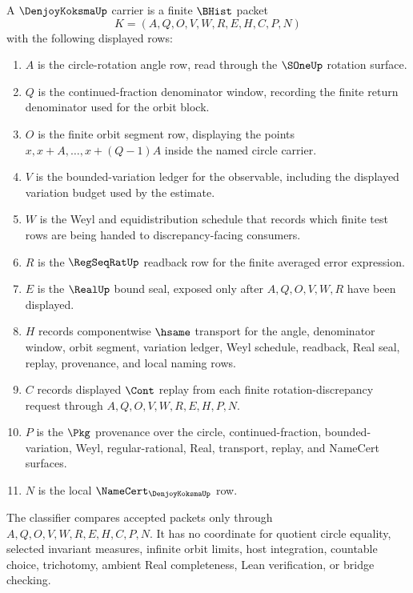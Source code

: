 \begin{definition}
\label{def:denjoy-koksma-carrier}
A $\DenjoyKoksmaUp$ carrier is a finite $\BHist$ packet
$$
K=(A,Q,O,V,W,R,E,H,C,P,N)
$$
with the following displayed rows:
\begin{enumerate}
\item $A$ is the circle-rotation angle row, read through the $\SOneUp$ rotation surface.
\item $Q$ is the continued-fraction denominator window, recording the finite return denominator used for the orbit block.
\item $O$ is the finite orbit segment row, displaying the points $x,x+A,\ldots,x+(Q-1)A$ inside the named circle carrier.
\item $V$ is the bounded-variation ledger for the observable, including the displayed variation budget used by the estimate.
\item $W$ is the Weyl and equidistribution schedule that records which finite test rows are being handed to discrepancy-facing consumers.
\item $R$ is the $\RegSeqRatUp$ readback row for the finite averaged error expression.
\item $E$ is the $\RealUp$ bound seal, exposed only after $A,Q,O,V,W,R$ have been displayed.
\item $H$ records componentwise $\hsame$ transport for the angle, denominator window, orbit segment, variation ledger, Weyl schedule, readback, Real seal, replay, provenance, and local naming rows.
\item $C$ records displayed $\Cont$ replay from each finite rotation-discrepancy request through $A,Q,O,V,W,R,E,H,P,N$.
\item $P$ is the $\Pkg$ provenance over the circle, continued-fraction, bounded-variation, Weyl, regular-rational, Real, transport, replay, and NameCert surfaces.
\item $N$ is the local $\NameCert_{\DenjoyKoksmaUp}$ row.
\end{enumerate}
The classifier compares accepted packets only through $A,Q,O,V,W,R,E,H,C,P,N$. It has no coordinate for quotient circle equality, selected invariant measures, infinite orbit limits, host integration, countable choice, trichotomy, ambient Real completeness, Lean verification, or bridge checking.
\end{definition}

